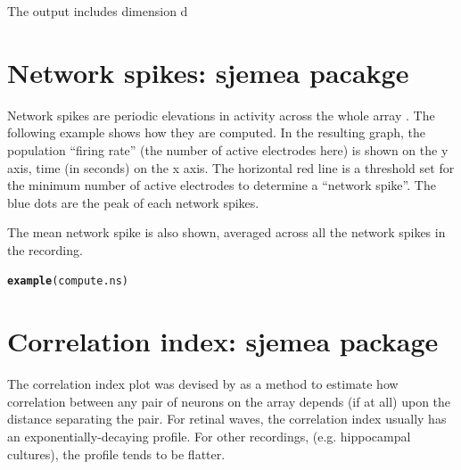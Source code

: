 \documentclass{article}\usepackage[]{graphicx}\usepackage[]{color}
\makeatletter
\newcommand{\hlstd}[1]{\textcolor[rgb]{0.345,0.345,0.345}{#1}}%
\newcommand{\hlkwd}[1]{\textcolor[rgb]{0.737,0.353,0.396}{\textbf{#1}}}%
\newenvironment{kframe}{%
 \def\at@end@of@kframe{}%
 \ifinner\ifhmode%
  \def\at@end@of@kframe{\end{minipage}}%
  \begin{minipage}{\columnwidth}%
 \fi\fi%
 \def\FrameCommand##1{\hskip\@totalleftmargin \hskip-\fboxsep
 \colorbox{shadecolor}{##1}\hskip-\fboxsep
     \hskip-\linewidth \hskip-\@totalleftmargin \hskip\columnwidth}%
 \MakeFramed {\advance\hsize-\width
   \@totalleftmargin\z@ \linewidth\hsize
   \@setminipage}}%
 {\par\unskip\endMakeFramed%
 \at@end@of@kframe}
\newenvironment{knitrout}{}{} %
\makeatother
\begin{document}
The output includes dimension d










\section*{Network spikes: sjemea pacakge }

Network spikes are periodic elevations in activity across the whole
array \citep{Eytan2006}.  The following example shows how they are computed.
In the resulting graph, the population ``firing rate'' (the number of
active electrodes here) is shown on the y axis, time (in seconds) on
the x axis.  The horizontal red line is a threshold set for the
minimum number of active electrodes to determine a ``network spike''.
The blue dots are the peak of each network spikes.

The mean network spike is also shown, averaged across all the network
spikes in the recording.

\begin{knitrout}
\color{fgcolor}\begin{kframe}
\begin{alltt}
\hlkwd{example}\hlstd{(compute.ns)}
\end{alltt}
\end{kframe}
\end{knitrout}


\section*{Correlation index: sjemea package}

The correlation index plot was devised by \citet{Wong1993} as a method to
estimate how correlation between any pair of neurons on the array
depends (if at all) upon the distance separating the pair.  For
retinal waves, the correlation index usually has an
exponentially-decaying profile.  For other recordings,
(e.g. hippocampal cultures), the profile tends to be flatter.
\end{document}
